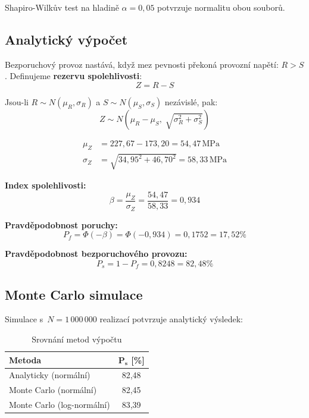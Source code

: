 \documentclass[a4paper,11pt]{article}
\newcommand{\unit}[1]{\,\mathrm{#1}}
\begin{document}
Shapiro-Wilkův test na hladině $\alpha = 0{,}05$ potvrzuje normalitu obou souborů.

\subsection{Analytický výpočet}

Bezporuchový provoz nastává, když mez pevnosti překoná provozní napětí: $R > S$. Definujeme \textbf{rezervu spolehlivosti}:
\begin{equation}
    Z = R - S
\end{equation}

Jsou-li $R \sim N(\mu_R, \sigma_R)$ a $S \sim N(\mu_S, \sigma_S)$ nezávislé, pak:
\begin{equation}
    Z \sim N\!\left(\mu_R - \mu_S,\; \sqrt{\sigma_R^2 + \sigma_S^2}\right)
\end{equation}

\begin{align}
    \mu_Z &= 227{,}67 - 173{,}20 = 54{,}47\unit{MPa} \\
    \sigma_Z &= \sqrt{34{,}95^2 + 46{,}70^2} = 58{,}33\unit{MPa}
\end{align}

\textbf{Index spolehlivosti:}
\begin{equation}
    \beta = \frac{\mu_Z}{\sigma_Z} = \frac{54{,}47}{58{,}33} = \boxed{0{,}934}
\end{equation}

\textbf{Pravděpodobnost poruchy:}
\begin{equation}
    P_f = \Phi(-\beta) = \Phi(-0{,}934) = 0{,}1752 = 17{,}52\%
\end{equation}

\textbf{Pravděpodobnost bezporuchového provozu:}
\begin{equation}
    \boxed{P_s = 1 - P_f = 0{,}8248 = 82{,}48\%}
\end{equation}

\subsection{Monte Carlo simulace}

Simulace s~$N = 1\,000\,000$ realizací potvrzuje analytický výsledek:

\begin{table}[H]
\centering
\caption{Srovnání metod výpočtu}
\begin{tabular}{lc}
\toprule
\textbf{Metoda} & $\boldsymbol{P_s}$ [\%] \\
\midrule
Analyticky (normální) & 82{,}48 \\
Monte Carlo (normální) & 82{,}45 \\
Monte Carlo (log-normální) & 83{,}39 \\
\bottomrule
\end{tabular}
\end{table}
\end{document}
